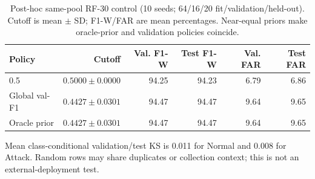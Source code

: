 \begin{table}[!htbp]
\centering
\caption{Post-hoc same-pool RF-30 control (10 seeds; 64/16/20 fit/validation/held-out). Cutoff is mean $\pm$ SD; F1-W/FAR are mean percentages. Near-equal priors make oracle-prior and validation policies coincide.}
\label{tab:randomsplit}
\small
\setlength{\tabcolsep}{4pt}
\begin{tabularx}{\textwidth}{@{}Xrrrrr@{}}
\toprule
Policy & Cutoff & Val. F1-W & Test F1-W & Val. FAR & Test FAR \\
\midrule
0.5 & $0.5000\pm0.0000$ & 94.25 & 94.23 & 6.79 & 6.86 \\
Global val-F1 & $0.4427\pm0.0301$ & 94.47 & 94.47 & 9.64 & 9.65 \\
Oracle prior & $0.4427\pm0.0301$ & 94.47 & 94.47 & 9.64 & 9.65 \\
\bottomrule
\end{tabularx}
\par\smallskip
\begin{minipage}{\textwidth}\footnotesize Mean class-conditional validation/test KS is 0.011 for Normal and 0.008 for Attack. Random rows may share duplicates or collection context; this is not an external-deployment test.\end{minipage}
\end{table}
